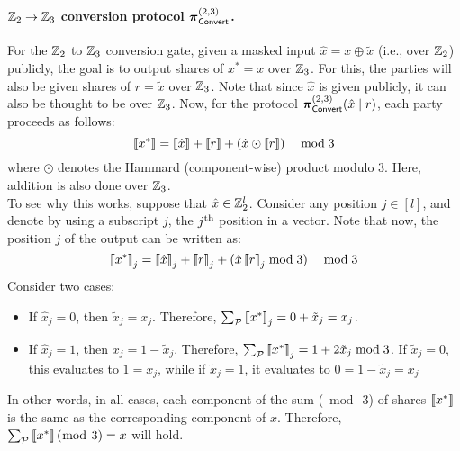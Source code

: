 \paragraph{$\mathbb{Z}_2 \to \mathbb{Z}_3$ conversion protocol $\boldsymbol{\pi}_{\textsf{Convert}}^{(2,3)}$.}
For the $\mathbb{Z}_2$ to $\mathbb{Z}_3$ conversion gate, given a masked input $\hat{x} = x \oplus \tilde{x}$ (i.e., over $\mathbb{Z}_2$) publicly, the goal is to output shares of $x^* = x$ over $\mathbb{Z}_3$. For this, the parties will also be given shares of $r = \tilde{x}$ over $\mathbb{Z}_3$. Note that since $\hat{x}$ is given publicly, it can also be thought to be over $\mathbb{Z}_3$. Now, for the protocol $\boldsymbol{\pi}_{\textsf{Convert}}^{(2,3)}(\hat{x} \mid r)$, each party proceeds as follows:
\[
\left\llbracket x^* \right\rrbracket = \left\llbracket \hat{x} \right\rrbracket + \left\llbracket r \right\rrbracket + (\hat{x} \odot \left\llbracket r \right\rrbracket) \quad \bmod 3
\]
where $\odot$ denotes the Hammard (component-wise) product modulo 3. Here, addition is also done over $\mathbb{Z}_3$. \\

\noindent To see why this works, suppose that $\hat{x} \in \mathbb{Z}_2^l$. Consider any position $j \in [l]$, and denote by using a subscript $j$, the $j^{\textnormal{th}}$ position in a vector. Note that now, the position $j$ of the output can be written as:
\[
    \left\llbracket x^* \right\rrbracket_j = \left\llbracket \hat{x} \right\rrbracket_j + \left\llbracket r \right\rrbracket_j + (\hat{x}\left\llbracket r \right\rrbracket_j\bmod 3) \quad \bmod 3
\]
Consider two cases:
\begin{itemize}
\item If $\hat{x}_j = 0$, then $\tilde{x}_j = x_j$. Therefore, $\sum_{\mathcal{P}} \left\llbracket x^* \right\rrbracket_j = 0 + \tilde{x}_j = x_j$.

\item If $\hat{x}_j = 1$, then $x_j = 1 - \tilde{x}_j$. Therefore, $\sum_{\mathcal{P}} \left\llbracket x^* \right\rrbracket_j = 1 + 2\tilde{x}_j \bmod 3$. If $\tilde{x}_j = 0$, this evaluates to $1 = x_j$, while if $\tilde{x}_j = 1$, it evaluates to $0 = 1 - \tilde{x}_j = x_j$
\end{itemize}
In other words, in all cases, each component of the sum ($\bmod~3$) of shares $\left\llbracket x^* \right\rrbracket$ is the same as the corresponding component of $x$. Therefore, $\sum_{\mathcal{P}} \left\llbracket x^* \right\rrbracket (\bmod~3) = x$ will hold.


